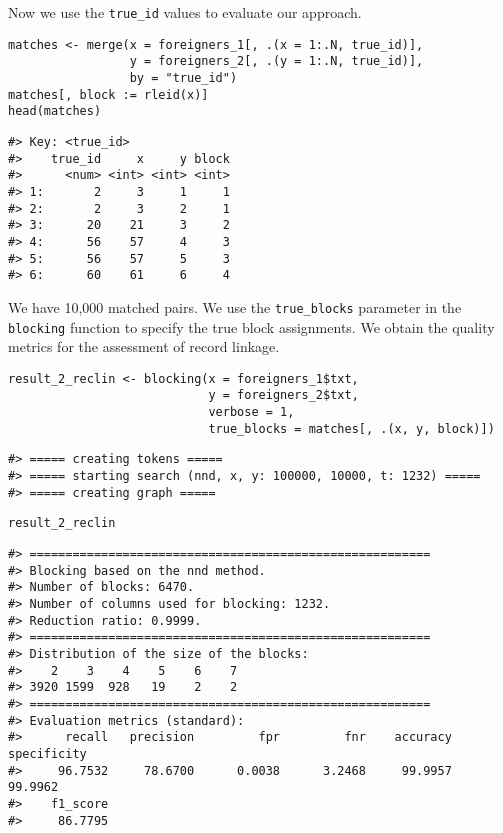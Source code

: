 Now we use the \texttt{true\_id} values to evaluate our approach.

\begin{verbatim}
matches <- merge(x = foreigners_1[, .(x = 1:.N, true_id)],
                 y = foreigners_2[, .(y = 1:.N, true_id)],
                 by = "true_id")
matches[, block := rleid(x)]
head(matches)
\end{verbatim}

\begin{verbatim}
#> Key: <true_id>
#>    true_id     x     y block
#>      <num> <int> <int> <int>
#> 1:       2     3     1     1
#> 2:       2     3     2     1
#> 3:      20    21     3     2
#> 4:      56    57     4     3
#> 5:      56    57     5     3
#> 6:      60    61     6     4
\end{verbatim}

We have 10,000 matched pairs. We use the \texttt{true\_blocks} parameter in the
\texttt{blocking} function to specify the true block assignments. We obtain the
quality metrics for the assessment of record linkage.

\begin{verbatim}
result_2_reclin <- blocking(x = foreigners_1$txt,
                            y = foreigners_2$txt,
                            verbose = 1,
                            true_blocks = matches[, .(x, y, block)])
\end{verbatim}

\begin{verbatim}
#> ===== creating tokens =====
#> ===== starting search (nnd, x, y: 100000, 10000, t: 1232) =====
#> ===== creating graph =====
\end{verbatim}

\begin{verbatim}
result_2_reclin
\end{verbatim}

\begin{verbatim}
#> ========================================================
#> Blocking based on the nnd method.
#> Number of blocks: 6470.
#> Number of columns used for blocking: 1232.
#> Reduction ratio: 0.9999.
#> ========================================================
#> Distribution of the size of the blocks:
#>    2    3    4    5    6    7 
#> 3920 1599  928   19    2    2 
#> ========================================================
#> Evaluation metrics (standard):
#>      recall   precision         fpr         fnr    accuracy specificity 
#>     96.7532     78.6700      0.0038      3.2468     99.9957     99.9962 
#>    f1_score 
#>     86.7795
\end{verbatim}

